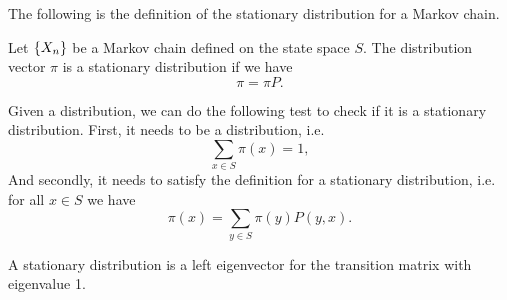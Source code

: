 The following is the definition of the stationary distribution for a Markov chain.

\begin{definition}
	Let $ \{X_n\} $ be a Markov chain defined on the state space $ S $. The distribution vector $ \pi $ is a stationary distribution if we have
	\[ \pi = \pi P. \]
\end{definition}

\begin{remark}
	Given a distribution, we can do the following test to check if it is a stationary distribution. First, it needs to be a distribution, i.e.
	\[ \sum_{x\in S} \pi(x) = 1, \]
	And secondly, it needs to satisfy the definition for a stationary distribution, i.e. for all $ x\in S$ we have
	\[ \pi(x) = \sum_{y\in S} \pi(y)P(y,x). \]
\end{remark}

\begin{observation}
	A stationary distribution is a left eigenvector for the transition matrix with eigenvalue 1. 
\end{observation}